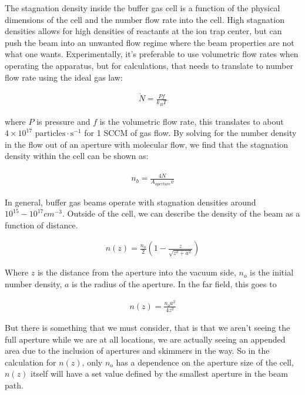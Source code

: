 The stagnation density inside the buffer gas cell is a function of the physical dimensions of the cell and the number flow rate into the cell. High stagnation densities allows for high densities of reactants at the ion trap center, but can push the beam into an unwanted flow regime where the beam properties are not what one wants. Experimentally, it's preferable to use volumetric flow rates when operating the apparatus, but for calculations, that needs to translate to number flow rate using the ideal gas law:

\begin{align}
\dot{N} = \frac{P f}{k_B T}
\end{align}

where $P$ is pressure and $f$ is the volumetric flow rate, this translates to about $4\times10^{17} \text{ particles} \cdot \text{s}^{-1}$ for 1 SCCM of gas flow. By solving for the number density in the flow out of an aperture with molecular flow, we find that the stagnation density within the cell can be shown as:

\begin{align}
n_{b}=\frac{4 \dot{N}}{A_{aperture} \bar{v}}
\end{align}

In general, buffer gas beams operate with stagnation densities around $10^{15}-10^{17} cm^{-3}$. Outside of the cell, we can describe the density of the beam as a function of distance. \cite{Pauly}

\begin{align}
n(z)=\frac{n_o}{2}\left(1-\frac{z}{\sqrt{z^2+a^2}}\right)
\end{align}

Where $z$ is the distance from the aperture into the vacuum side, $n_o$ is the initial number density, $a$ is the radius of the aperture. In the far field, this goes to

\begin{align}
n(z)=\frac{n_o a^2}{4 z^2}
\end{align}

But there is something that we must consider, that is that we aren't seeing the full aperture while we are at all locations, we are actually seeing an appended area due to the inclusion of apertures and skimmers in the way. So in the calculation for $n(z)$, only $n_o$ has a dependence on the aperture size of the cell, $n(z)$ itself will have a set value defined by the smallest aperture in the beam path.

